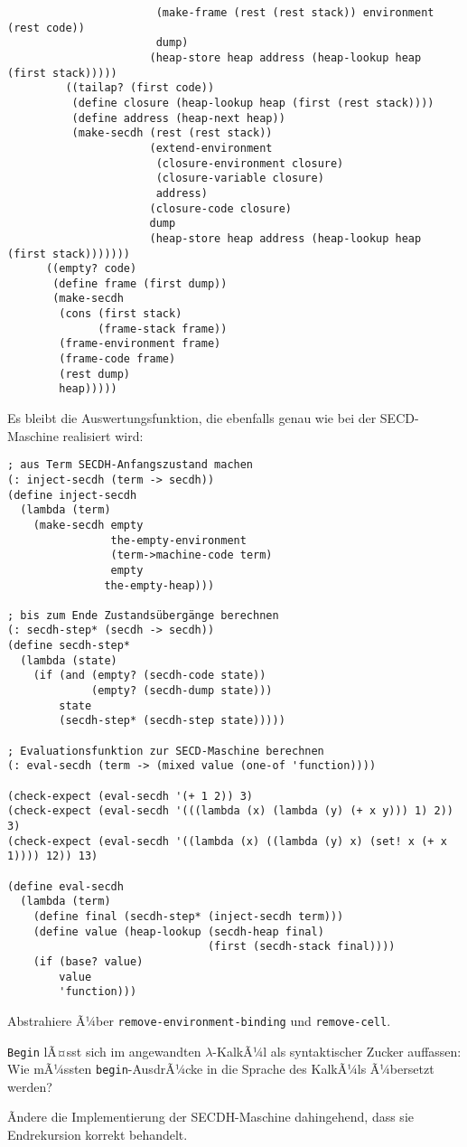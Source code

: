 \begin{lstlisting}
                       (make-frame (rest (rest stack)) environment (rest code))
                       dump)
                      (heap-store heap address (heap-lookup heap (first stack)))))
         ((tailap? (first code))
          (define closure (heap-lookup heap (first (rest stack))))
          (define address (heap-next heap))
          (make-secdh (rest (rest stack))
                      (extend-environment
                       (closure-environment closure)
                       (closure-variable closure)
                       address)
                      (closure-code closure)
                      dump
                      (heap-store heap address (heap-lookup heap (first stack)))))))
      ((empty? code)
       (define frame (first dump))
       (make-secdh
        (cons (first stack)
              (frame-stack frame))
        (frame-environment frame)
        (frame-code frame)
        (rest dump)
        heap)))))
\end{lstlisting}
Es bleibt die Auswertungsfunktion, die ebenfalls genau wie bei der
SECD-Maschine realisiert wird:
%
\begin{lstlisting}
; aus Term SECDH-Anfangszustand machen
(: inject-secdh (term -> secdh))
(define inject-secdh
  (lambda (term)
    (make-secdh empty
                the-empty-environment
                (term->machine-code term)
                empty
               the-empty-heap)))

; bis zum Ende Zustandsübergänge berechnen
(: secdh-step* (secdh -> secdh))
(define secdh-step*
  (lambda (state)
    (if (and (empty? (secdh-code state))
             (empty? (secdh-dump state)))
        state
        (secdh-step* (secdh-step state)))))

; Evaluationsfunktion zur SECD-Maschine berechnen
(: eval-secdh (term -> (mixed value (one-of 'function))))

(check-expect (eval-secdh '(+ 1 2)) 3)
(check-expect (eval-secdh '(((lambda (x) (lambda (y) (+ x y))) 1) 2)) 3)
(check-expect (eval-secdh '((lambda (x) ((lambda (y) x) (set! x (+ x 1)))) 12)) 13)

(define eval-secdh
  (lambda (term)
    (define final (secdh-step* (inject-secdh term)))
    (define value (heap-lookup (secdh-heap final)
                               (first (secdh-stack final))))
    (if (base? value)
        value
        'function)))
\end{lstlisting}


\begin{aufgabe}
  Abstrahiere Ã¼ber \lstinline{remove-environment-binding} und
  \lstinline{remove-cell}.
\end{aufgabe}


\begin{aufgabe}
  \lstinline{Begin} lÃ¤sst sich im angewandten $\lambda$-KalkÃ¼l als
  syntaktischer Zucker auffassen: Wie mÃ¼ssten \lstinline{begin}-AusdrÃ¼cke
  in die Sprache des KalkÃ¼ls Ã¼bersetzt werden?
\end{aufgabe}

\begin{aufgabe}
  Ãndere die Implementierung der SECDH-Maschine dahingehend, dass
  sie Endrekursion korrekt behandelt.
\end{aufgabe}

